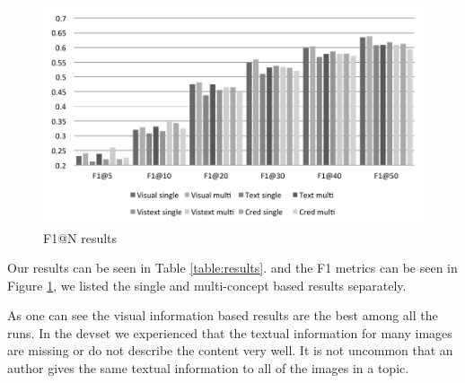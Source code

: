 \documentclass{sig-alternate}
\begin{document}
\begin{figure}[h]
\includegraphics[width=1.0\linewidth]{f1}
\caption{F1@N results}
\label{fig:f1}
\end{figure}

Our results can be seen in Table \ref{table:results}. and the F1 metrics can be seen in Figure \ref{fig:f1}, we listed the single and multi-concept based results separately. 

As one can see the visual information based results are the best among all the runs. In the devset we experienced that the textual information for many images are missing or do not describe the content very well. It is not uncommon that an author gives the same textual information to all of the images in a topic.



\end{document}
